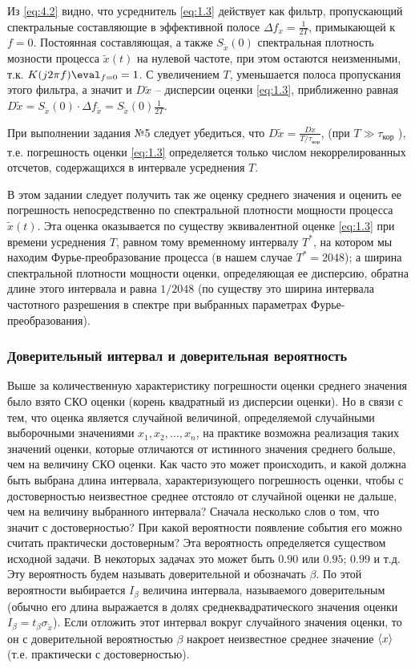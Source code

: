 Из \eqref{eq:4.2}  видно, что усреднитель \eqref{eq:1.3} действует как фильтр,
пропускающий спектральные составляющие в эффективной полосе $\Delta f_x = \frac{1}{2T}$,
примыкающей к $f=0$. Постоянная составляющая, а также $S_{\tilde x}(0)$ спектральная плотность
мозности процесса $\tilde x(t)$ на нулевой частоте, при этом остаются неизменными, т.к.
$K(j 2 \pi f) \eval_{f=0}=1$. С увеличением $T$, уменьшается полоса пропускания этого фильтра,
а значит и $D{\tilde x}$ -- дисперсии оценки \eqref{eq:1.3},
приближенно равная $D{\tilde x}=S_{\tilde x}(0)\cdot \Delta f_{\tilde x} = S_{\tilde x}(0) \frac{1}{2T}$.

При выполнении задания №5 следует убедиться, что $D{\tilde x} = \frac{D{x}}{T / \tau_{\text{кор}}}$, (при $T\gg \tau_{\text{кор}}$ ), т.е.
погрешность оценки \eqref{eq:1.3} определяется только числом некоррелированных отсчетов,
содержащихся в интервале усреднения $T$.

В этом задании следует получить так же оценку среднего значения и оценить ее 
погрешность непосредственно по спектральной плотности мощности процесса $\tilde x(t)$. 
Эта оценка оказывается по существу эквивалентной оценке \eqref{eq:1.3}  при времени усреднения $T$,
равном тому временному интервалу $T^*$, на котором мы находим Фурье-преобразование процесса 
(в нашем случае $T^*=2048$); а ширина спектральной плотности мощности оценки, определяющая 
ее дисперсию, обратна длине этого интервала и равна $1/2048$ (по существу это ширина 
интервала частотного разрешения в спектре при выбранных параметрах Фурье-преобразования).

\subsubsection{Доверительный интервал и доверительная вероятность}%
\label{sec:doveritel_nyi_interval_i_doveritel_naia_veroiatnost_}
Выше за количественную характеристику погрешности оценки среднего значения было взято СКО 
оценки (корень квадратный из дисперсии оценки). Но в связи с тем, что оценка является 
случайной величиной, определяемой случайными выборочными значениями $x_1,x_2,\dots,x_n$,
на практике возможна реализация таких значений оценки, которые отличаются от истинного
значения среднего больше, чем на величину СКО оценки. Как часто это может происходить, и
какой должна быть выбрана длина интервала, характеризующего погрешность оценки, чтобы с
достоверностью неизвестное среднее отстояло от случайной оценки не дальше, чем на величину 
выбранного интервала? Сначала несколько слов о том, что значит с достоверностью? При какой 
вероятности появление события его можно считать практически достоверным? Эта вероятность 
определяется существом исходной задачи. В некоторых задачах это может быть $0.90$ или $0.95$; $0.99$ и т.д. Эту вероятность будем называть доверительной и обозначать $\beta$. 
По этой вероятности выбирается $I_{\beta}$ величина интервала, называемого доверительным 
(обычно его длина выражается в долях среднеквадратического значения оценки $I_{\beta}=t_{\beta} \sigma_{{\tilde x}}$). 
Если отложить этот интервал вокруг случайного значения оценки, то он с доверительной 
вероятностью $\beta$ накроет неизвестное среднее значение $\langle x\rangle$ (т.е. практически с достоверностью).

